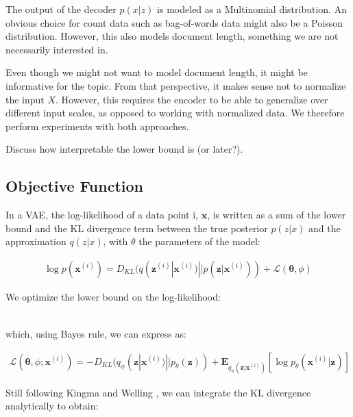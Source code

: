 \documentclass{report}
\begin{document}
The output of the decoder $p(x|z)$ is modeled as a Multinomial distribution. An obvious choice for count data such as bag-of-words data might also be a Poisson distribution. However, this also models document length, something we are not necessarily interested in.  

Even though we might not want to model document length, it might be informative for the topic. From that perspective, it makes sense not to normalize the input $X$. However, this requires the encoder to be able to generalize over different input scales, as opposed to working with normalized data. We therefore perform experiments with both approaches.

Discuss how interpretable the lower bound is (or later?). 

\subsection{Objective Function}

In a VAE, the log-likelihood of a data point i, $\mathbf{x}$, is written as a sum of the lower bound and the KL divergence term between the true posterior $p(z|x)$ and the approximation $q(z|x)$, with $\theta$ the parameters of the model:

\begin{align*}
\log p(\mathbf{x}^{(i)}) = D_{KL}(q(\mathbf{z}^{(i)}|\mathbf{x}^{(i)}) || p(\mathbf{z}|\mathbf{x}^{(i)})) + \mathcal{L}(\mathbf{\theta}, \phi)
\end{align*}

We optimize the lower bound on the log-likelihood: 

\begin{align}
\end{align}

which, using Bayes rule, we can express as:

\begin{align}
\mathcal{L}(\mathbf{\theta}, \phi; \mathbf{x}^{(i)}) = -D_{KL}(q_\phi (\mathbf{z}| \mathbf{x}^{(i)})||p_\theta (\mathbf{z})) + \mathbf{E}_{q_\phi(\mathbf{z}|\mathbf{x}^{(i)})}[\log p_\theta (\mathbf{x}^{(i)}|\mathbf{z})]
\end{align}



Still following Kingma and Welling \cite{kingma2013auto}, we can integrate the KL divergence analytically to obtain: \\
\end{document}
